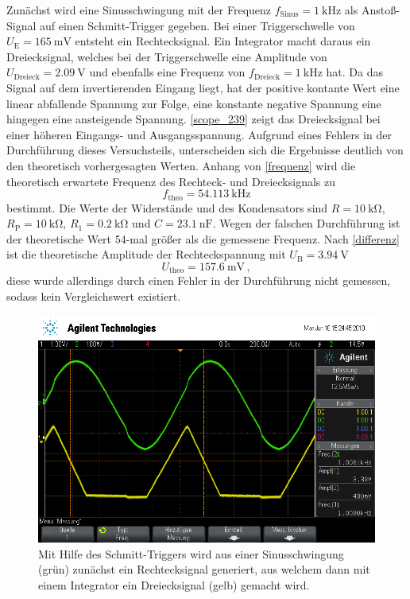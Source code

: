 Zunächst wird eine Sinusschwingung mit der Frequenz $f_\text{Sinus} = \SI{1}{\kilo\hertz}$ als Anstoß-Signal auf einen Schmitt-Trigger gegeben. Bei einer Triggerschwelle von $U_\text{E} = \SI{165}{\milli\volt}$ entsteht ein Rechtecksignal. Ein Integrator macht daraus ein Dreiecksignal, welches bei der Triggerschwelle eine Amplitude von $U_\text{Dreieck} = \SI{2.09}{\volt}$ und ebenfalls eine Frequenz von $f_\text{Dreieck} = \SI{1}{\kilo\hertz}$ hat. Da das Signal auf dem invertierenden Eingang liegt, hat der positive kontante Wert eine linear abfallende Spannung zur Folge, eine konstante negative Spannung eine hingegen eine ansteigende Spannung. \autoref{scope_239} zeigt das Dreiecksignal bei einer höheren Eingangs- und Ausgangsspannung. Aufgrund eines Fehlers in der Durchführung dieses Versuchsteils, unterscheiden sich die Ergebnisse deutlich von den theoretisch vorhergesagten Werten. Anhang von \autoref{frequenz} wird die theoretisch erwartete Frequenz des Rechteck- und Dreiecksignals zu
\begin{equation*}
	f_\text{theo} = \SI{54.113}{\kilo\hertz}
\end{equation*}
bestimmt. Die Werte der Widerstände und des Kondensators sind $R = \SI{10}{\kilo\ohm}$, $R_\text{P} = \SI{10}{\kilo\ohm}$, $R_1 = \SI{0.2}{\kilo\ohm}$ und $C = \SI{23.1}{\nano\farad}$. Wegen der falschen Durchführung ist der theoretische Wert 54-mal größer als die gemessene Frequenz. Nach \autoref{differenz} ist die theoretische Amplitude der Rechteckspannung mit $U_\text{B} = \SI{3.94}{\volt}$
\begin{equation*}
	U_\text{theo} = \SI{157.6}{\milli\volt}\, ,
\end{equation*}
diese wurde allerdings durch einen Fehler in der Durchführung nicht gemessen, sodass kein Vergleichswert existiert.
\begin{figure}[h]
	\centering
	\includegraphics[width=\textwidth]{usb/scope_239.png}
	\caption{Mit Hilfe des Schmitt-Triggers wird aus einer Sinusschwingung (grün) zunächst ein Rechtecksignal generiert, aus welchem dann mit einem Integrator ein Dreiecksignal (gelb) gemacht wird.}
	\label{scope_239}
\end{figure}

